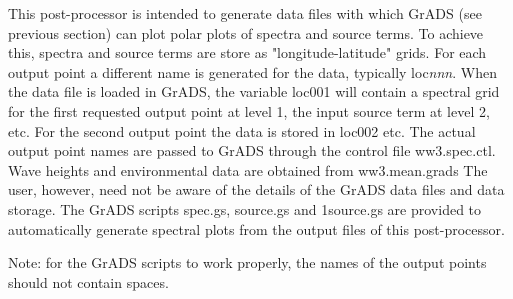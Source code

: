 
\vspace{\baselineskip} 
\noindent
This post-processor is intended to generate data files with which GrADS (see
previous section) can plot polar plots of spectra and source terms. To achieve
this, spectra and source terms are store as "longitude-latitude" grids. For
each output point a different name is generated for the data, typically {\F
loc{\it nnn}}. When the data file is loaded in GrADS, the variable {\F loc001}
will contain a spectral grid for the first requested output point at level 1,
the input source term at level 2, etc. For the second output point the data is
stored in {\F loc002} etc. The actual output point names are passed to GrADS
through the control file {\file ww3.spec.ctl}. Wave heights and environmental
data are obtained from {\file ww3.mean.grads} The user, however, need not be
aware of the details of the GrADS data files and data storage. The GrADS
scripts {\file spec.gs}, {\file source.gs} and {\file 1source.gs} are provided
to automatically generate spectral plots from the output files of this
post-processor.

Note: for the GrADS scripts to work properly, the names of the output points
should not contain spaces.

\pb
\label{pg:tab_fields}


